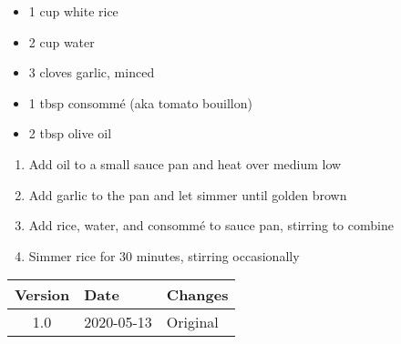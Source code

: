 
\ingredients
\begin{multicols}{2}
\raggedcolumns %
\begin{itemize}
    \item 1 cup white rice
    \item 2  cup water
    \item 3 cloves garlic, minced
    \item 1 tbsp consommé (aka tomato bouillon)
    \item 2 tbsp olive oil
\end{itemize}
\end{multicols}

\instructions
\begin{enumerate}
    \item Add oil to a small sauce pan and heat over medium low
    \item Add garlic to the pan and let simmer until golden brown
    \item Add rice, water, and consommé to sauce pan, stirring to combine
    \item Simmer rice for 30 minutes, stirring occasionally 
\end{enumerate}

\vfill

\begin{tabular}{ c | l | l }
  \textbf{Version} & \textbf{Date} & \textbf{Changes} \\ 
  \hline		
  1.0 & 2020-05-13 & Original \\
\end{tabular}

